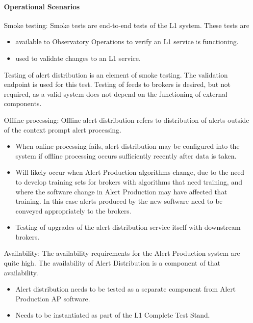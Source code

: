 \paragraph{Operational Scenarios}

Smoke testing:  Smoke tests are end-to-end tests of the L1 system. These tests are

\begin{itemize}

\item available to Observatory Operations to verify an L1 service is functioning.

\item used to validate changes to an L1 service.

\end{itemize}

Testing of alert distribution is an element of smoke testing. The validation endpoint is used for this test. Testing of feeds to brokers is desired, but not required, as a valid system does not depend on the functioning of external components.

Offline processing:  Offline alert distribution refers to distribution of alerts outside of the context prompt alert processing.

\begin{itemize}

\item When online processing fails, alert distribution may be configured into the system if offline processing occurs sufficiently recently after data is taken.

\item Will likely occur when Alert Production algorithms change, due to the need to develop training sets for brokers with algorithms that need training, and where the software change in Alert Production may have affected that training. In this case alerts produced by the new software need to be conveyed appropriately to the brokers. 

\item Testing of upgrades of the alert distribution service itself with downstream brokers. 

\end{itemize}

Availability: The availability requirements for the Alert Production system are quite high. The availability of Alert Distribution is a component of that availability.   

\begin{itemize}

\item Alert distribution needs to be tested as a separate component from Alert Production AP software.

\item Needs to be instantiated as part of the L1 Complete Test Stand. 

\end{itemize}

